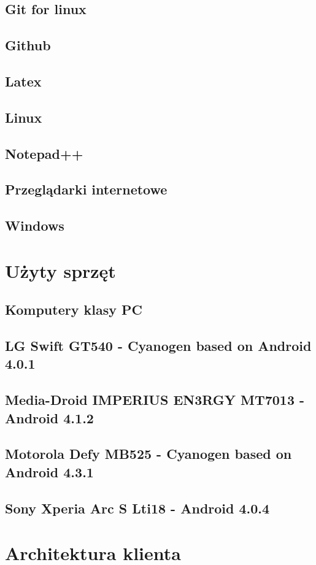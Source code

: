 \documentclass[11pt,a4paper,polish,thesis]{dcsbook}
\begin{document}
\subsection{Git for linux}
\subsection{Github}
\subsection{Latex}
\subsection{Linux}
\subsection{Notepad++}
\subsection{Przeglądarki internetowe}
\subsection{Windows}
\section{Użyty sprzęt}
\subsection{Komputery klasy PC}
\subsection{LG Swift GT540 - Cyanogen based on Android 4.0.1}
\subsection{Media-Droid IMPERIUS EN3RGY MT7013 - Android 4.1.2}
\subsection{Motorola Defy MB525 - Cyanogen based on Android 4.3.1}
\subsection{Sony Xperia Arc S Lti18 - Android 4.0.4}

\section{Architektura klienta}
\end{document}
